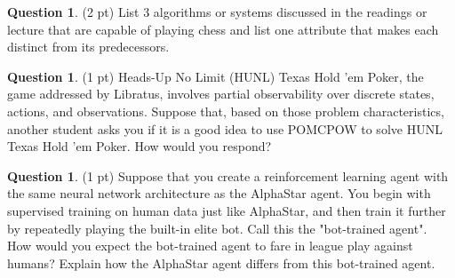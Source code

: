 \documentclass{article}
\theoremstyle{definition}
\newtheorem{question}[thm]{Question}
\begin{document}
\begin{question}
    (2 pt) List 3 algorithms or systems discussed in the readings or lecture that are capable of playing chess and list one attribute that makes each distinct from its predecessors.
\end{question}


\begin{question}
    (1 pt) Heads-Up No Limit (HUNL) Texas Hold 'em Poker, the game addressed by Libratus, involves partial observability over discrete states, actions, and observations. Suppose that, based on those problem characteristics, another student asks you if it is a good idea to use  POMCPOW to solve HUNL Texas Hold 'em Poker. How would you respond?
\end{question}


\begin{question}
    (1 pt) Suppose that you create a reinforcement learning agent with the same neural network architecture as the AlphaStar agent. You begin with supervised training on human data just like AlphaStar, and then train it further by repeatedly playing the built-in elite bot. Call this the "bot-trained agent". How would you expect the bot-trained agent to fare in league play against humans? Explain how the AlphaStar agent differs from this bot-trained agent.
\end{question}
\end{document}
